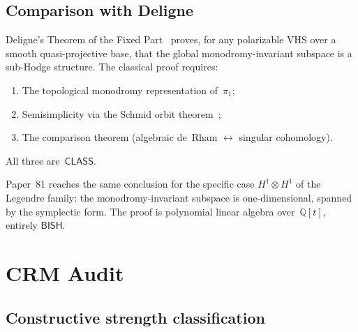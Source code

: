\documentclass[11pt]{article}
\theoremstyle{plain}
\theoremstyle{definition}
\theoremstyle{remark}
\newcommand{\Q}{\mathbb{Q}}
\newcommand{\BISH}{\mathsf{BISH}}
\newcommand{\CLASS}{\mathsf{CLASS}}
\begin{document}
\subsection{Comparison with Deligne}

Deligne's Theorem of the Fixed Part~\cite{Deligne1972}
proves, for any polarizable VHS over a smooth
quasi-projective base, that the global monodromy-invariant
subspace is a sub-Hodge structure.  The classical proof
requires:
\begin{enumerate}[nosep]
\item The topological monodromy representation of~$\pi_1$;
\item Semisimplicity via the Schmid orbit
      theorem~\cite{Schmid1973};
\item The comparison theorem (algebraic de~Rham $\leftrightarrow$
      singular cohomology).
\end{enumerate}
All three are~$\CLASS$.

Paper~81 reaches the same conclusion for the specific case
$H^1 \otimes H^1$ of the Legendre family: the
monodromy-invariant subspace is one-dimensional, spanned
by the symplectic form.  The proof is polynomial linear
algebra over~$\Q[t]$, entirely $\BISH$.

\section{CRM Audit}\label{sec:crm}

\subsection{Constructive strength classification}
\end{document}
